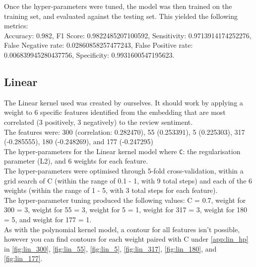 Once the hyper-parameters were tuned, the model was then trained on the training set, and evaluated against the testing set.
This yielded the following metrics:\\
Accuracy: 0.982, 
F1 Score: 0.9822485207100592, 
Sensitivity: 0.9713914174252276, 
False Negative rate: 0.02860858257477243, 
False Positive rate: 0.006839945280437756, 
Specificity: 0.9931600547195623.

\subsection{Linear}




The Linear kernel used was created by ourselves. It should work by applying a weight to 6 specific features identified from the embedding that are most correlated (3 positively, 3 negatively) to the review sentiment.\\
The features were: 300 (correlation: 0.282470), 55 (0.253391), 5 (0.225303), 317 (-0.285555), 180 (-0.248269), and 177 (-0.247295)\\

The hyper-parameters for the Linear kernel model where \verb|C|: the regularisation parameter (L2), and 6 weights for each feature.\\
The hyper-parameters were optimised through 5-fold cross-validation, within a grid search of C (within the range of 0.1 - 1, with 9 total steps) and each of the 6 weights (within the range of 1 - 5, with 3 total steps for each feature).\\
The hyper-parameter tuning produced the following values: C = 0.7, weight for 300 = 3, weight for 55 = 3, weight for 5 = 1, weight for 317 = 3, weight for 180 = 5, and weight for 177 = 1.\\
As with the polynomial kernel model, a contour for all features isn't possible, however you can find contours for each weight paired with C under \autoref{app:lin_hp} in \autoref{fig:lin_300}, \autoref{fig:lin_55}, \autoref{fig:lin_5}, \autoref{fig:lin_317}, \autoref{fig:lin_180}, and \autoref{fig:lin_177}.

